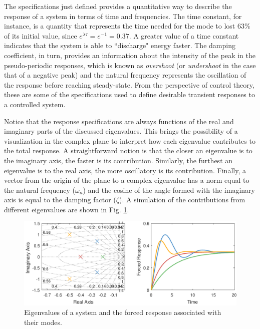 \documentclass[a4paper,11pt]{book}
\numberwithin{figure}{chapter}
\numberwithin{equation}{chapter}
\numberwithin{table}{chapter}
\theoremstyle{definition}
\begin{document}
The specifications just defined provides a quantitative way to describe the response of a system in terms of time and frequencies. The time constant, for instance, is a quantity that represents the time needed for the mode to lost $63\%$ of its initial value, since $e^{\lambda \tau} = e^{-1} = 0.37$. A greater value of a time constant indicates that the system is able to ``discharge" energy faster. The damping coefficient, in turn, provides an information about the intensity of the peak in the pseudo-periodic responses, which is known as \textit{overshoot} (or \textit{undershoot} in the case that of a negative peak) and the natural frequency represents the oscillation of the response before reaching steady-state. From the perspective of control theory, these are some of the specifications used to define desirable transient responses to a controlled system.

Notice that the response specifications are always functions of the real and imaginary parts of the discussed eigenvalues. This brings the possibility of a visualization in the complex plane to interpret how each eigenvalue contributes to the total response. A straightforward notion is that the closer an eigenvalue is to the imaginary axis, the faster is its contribution. Similarly, the furthest an eigenvalue is to the real axis, the more oscillatory is its contribution. Finally, a vector from the origin of the plane to a complex eigenvalue has a norm equal to the natural frequency ($\omega_n$) and the cosine of the angle formed with the imaginary axis is equal to the damping factor ($\zeta$). A simulation of the contributions from different eigenvalues are shown in Fig. \ref{fig:eigen01}.

\begin{figure}[ht]
    \centering
    \includegraphics[width=\textwidth]{chapter2/eigen01}
    \caption{Eigenvalues of a system and the forced response associated with their modes.}
    \label{fig:eigen01}
\end{figure}
\end{document}
